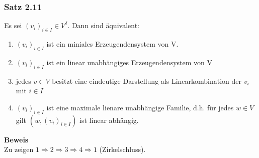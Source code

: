 \documentclass{scrartcl}
\begin{document}
\subsubsection{Satz 2.11}
Es sei \((v_i)_{i\in I} \in V^I\). Dann sind \"aquivalent:
\begin{enumerate}
\item{\((v_i)_{i \in I}\) ist ein miniales Erzeugendensystem von V.}
\item{\((v_i)_{i \in I}\) ist ein linear unabh\"angiges Erzeugendensystem von V}
\item{jedes \(v \in V\) besitzt eine eindeutige Darstellung als Linearkombination der \(v_i\) mit \(i \in I\)}
\item{\((v_i)_{i \in I}\) ist eine maximale lienare unabh\"angige Familie, d.h. f\"ur jedes \(w \in V\) gilt \((w, (v_i)_{i \in I})\) ist linear abh\"angig.}
\end{enumerate}
\textbf{Beweis}\\
Zu zeigen \(1 \Rightarrow 2 \Rightarrow 3 \Rightarrow 4 \Rightarrow 1\) (Zirkelschluss).\\
\end{document}

